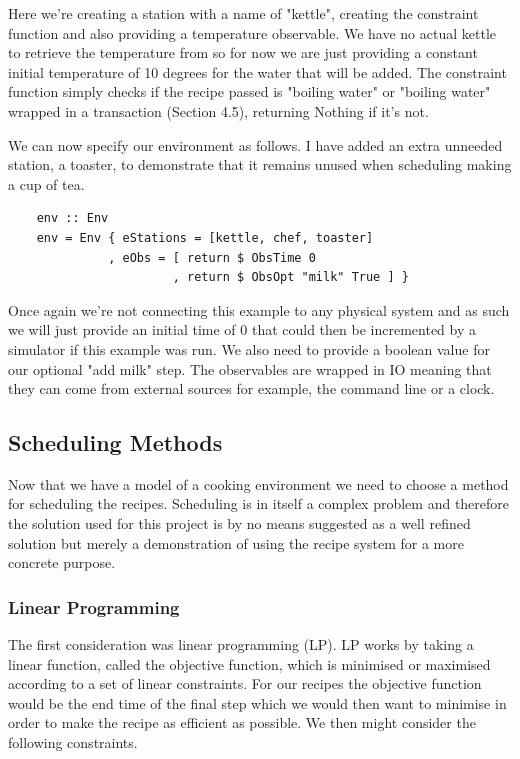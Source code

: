 \documentclass[11pt]{article}
\begin{document}
Here we're creating a station with a name of "kettle", creating the constraint function
and also providing a temperature observable. We have no actual kettle to retrieve the temperature
from so for now we are just providing a constant initial temperature of 10 degrees for the water
that will be added. The constraint function simply checks if the recipe passed is "boiling water"
or "boiling water" wrapped in a transaction (Section 4.5), returning Nothing if it's not.

\medbreak

We can now specify our environment as follows. I have added an extra unneeded station, a toaster,
to demonstrate that it remains unused when scheduling making a cup of tea.

\begin{lstlisting}
    env :: Env
    env = Env { eStations = [kettle, chef, toaster]
              , eObs = [ return $ ObsTime 0
                       , return $ ObsOpt "milk" True ] }
\end{lstlisting}

Once again we're not connecting this example to any physical system and as such we will just provide
an initial time of 0 that could then be incremented by a simulator if this example was run.
We also need to provide a boolean value for our optional "add milk" step. The observables are
wrapped in IO meaning that they can come from external sources for example, the command line
or a clock.

\subsection{Scheduling Methods}

Now that we have a model of a cooking environment we need to choose a method for scheduling the recipes.
Scheduling is in itself a complex problem and therefore the solution used for this project is by
no means suggested as a well refined solution but merely a demonstration of using the recipe system
for a more concrete purpose.

\subsubsection{Linear Programming}
The first consideration was linear programming (LP). LP works by taking a linear function, called
the objective function, which is minimised or maximised according to a set of linear constraints.
For our recipes the objective function would be the end time of the final step which we would then
want to minimise in order to make the recipe as efficient as possible. We then might consider the
following constraints.
\end{document}
